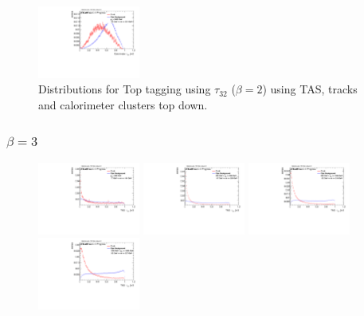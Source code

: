 \begin{figure}[H]
\includegraphics[width=0.3\textwidth]{sascha_input/Appendix/Distributions/top/distributions/beta2/h_recoJet_nSub32_2_bin6.pdf}
\caption{{Distributions for Top tagging using $\tau_{32}$ ($\beta=2$) using TAS, tracks and calorimeter clusters top down.}}
\end{figure}

\subsubsection*{$\beta=3$}
\begin{figure}[H]
\includegraphics[width=0.3\textwidth]{sascha_input/Appendix/Distributions/top/distributions/beta3/h_assisted_tj_nSub32_3_bin1.pdf} \hspace{1mm}
\includegraphics[width=0.3\textwidth]{sascha_input/Appendix/Distributions/top/distributions/beta3/h_assisted_tj_nSub32_3_bin2.pdf} \hspace{1mm}
\includegraphics[width=0.3\textwidth]{sascha_input/Appendix/Distributions/top/distributions/beta3/h_assisted_tj_nSub32_3_bin3.pdf} 
\bigskip
\includegraphics[width=0.3\textwidth]{sascha_input/Appendix/Distributions/top/distributions/beta3/h_assisted_tj_nSub32_3_bin4.pdf} \hspace{1mm}

\end{figure}
